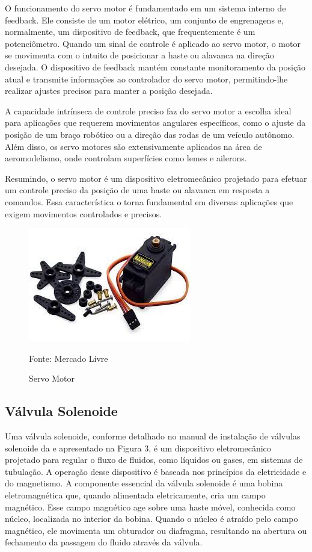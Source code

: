O funcionamento do servo motor é fundamentado em um sistema interno de feedback. Ele consiste de um motor elétrico, um conjunto de engrenagens e, normalmente, um dispositivo de feedback, que frequentemente é um potenciômetro. Quando um sinal de controle é aplicado ao servo motor, o motor se movimenta com o intuito de posicionar a haste ou alavanca na direção desejada. O dispositivo de feedback mantém constante monitoramento da posição atual e transmite informações ao controlador do servo motor, permitindo-lhe realizar ajustes precisos para manter a posição desejada.

A capacidade intrínseca de controle preciso faz do servo motor a escolha ideal para aplicações que requerem movimentos angulares específicos, como o ajuste da posição de um braço robótico ou a direção das rodas de um veículo autônomo. Além disso, os servo motores são extensivamente aplicados na área de aeromodelismo, onde controlam superfícies como lemes e ailerons.

Resumindo, o servo motor é um dispositivo eletromecânico projetado para efetuar um controle preciso da posição de uma haste ou alavanca em resposta a comandos. Essa característica o torna fundamental em diversas aplicações que exigem movimentos controlados e precisos.

 \begin{figure}[H]
    \caption{Servo Motor}
    \label{fig:servomotorImagem}
    \begin{center}
        
        \includegraphics[scale=1]{Textuais/imagens/servomotor.png}
        
        Fonte: Mercado Livre
    \end{center}
\end{figure}

\subsection{Válvula Solenoide}
Uma válvula solenoide, conforme detalhado no manual de instalação de válvulas solenoide da \cite{valvula} e apresentado na Figura 3, é um dispositivo eletromecânico projetado para regular o fluxo de fluidos, como líquidos ou gases, em sistemas de tubulação. A operação desse dispositivo é baseada nos princípios da eletricidade e do magnetismo. A componente essencial da válvula solenoide é uma bobina eletromagnética que, quando alimentada eletricamente, cria um campo magnético. Esse campo magnético age sobre uma haste móvel, conhecida como núcleo, localizada no interior da bobina. Quando o núcleo é atraído pelo campo magnético, ele movimenta um obturador ou diafragma, resultando na abertura ou fechamento da passagem do fluido através da válvula.


